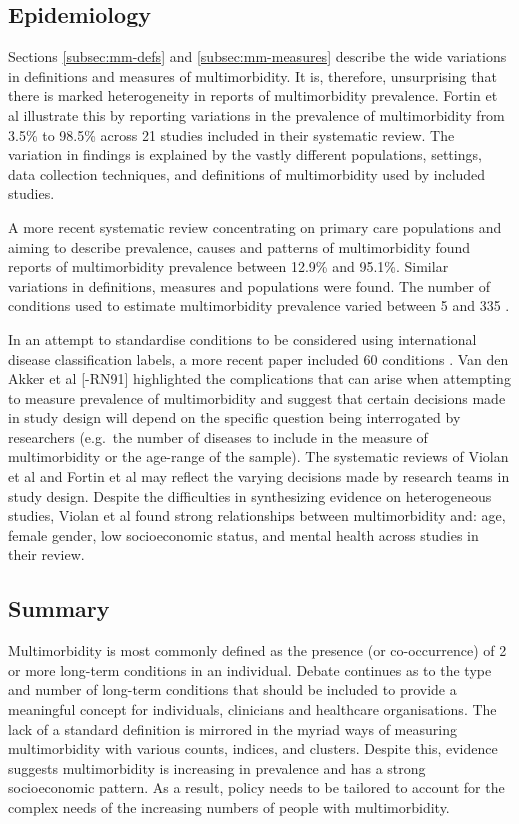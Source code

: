 \documentclass[12pt,]{report}
\begin{document}
\subsection{Epidemiology}\label{subsec:mm-epi}

Sections \ref{subsec:mm-defs} and \ref{subsec:mm-measures} describe the
wide variations in definitions and measures of multimorbidity. It is,
therefore, unsurprising that there is marked heterogeneity in reports of
multimorbidity prevalence. Fortin et al \citeyearpar{RN56} illustrate
this by reporting variations in the prevalence of multimorbidity from
3.5\% to 98.5\% across 21 studies included in their systematic review.
The variation in findings is explained by the vastly different
populations, settings, data collection techniques, and definitions of
multimorbidity used by included studies.

A more recent systematic review concentrating on primary care
populations and aiming to describe prevalence, causes and patterns of
multimorbidity \citep{RN15} found reports of multimorbidity prevalence
between 12.9\% and 95.1\%. Similar variations in definitions, measures
and populations were found. The number of conditions used to estimate
multimorbidity prevalence varied between 5 and 335 \citep{RN15}.

In an attempt to standardise conditions to be considered using
international disease classification labels, a more recent paper
included 60 conditions \citep{RN300}. Van den Akker et al {[}-RN91{]}
highlighted the complications that can arise when attempting to measure
prevalence of multimorbidity and suggest that certain decisions made in
study design will depend on the specific question being interrogated by
researchers (e.g.~the number of diseases to include in the measure of
multimorbidity or the age-range of the sample). The systematic reviews
of Violan et al \citeyearpar{RN15} and Fortin et al \citeyearpar{RN56}
may reflect the varying decisions made by research teams in study
design. Despite the difficulties in synthesizing evidence on
heterogeneous studies, Violan et al \citeyearpar{RN15} found strong
relationships between multimorbidity and: age, female gender, low
socioeconomic status, and mental health across studies in their review.

\subsection{Summary}\label{subsec:mm-summary}

Multimorbidity is most commonly defined as the presence (or
co-occurrence) of 2 or more long-term conditions in an individual.
Debate continues as to the type and number of long-term conditions that
should be included to provide a meaningful concept for individuals,
clinicians and healthcare organisations. The lack of a standard
definition is mirrored in the myriad ways of measuring multimorbidity
with various counts, indices, and clusters. Despite this, evidence
suggests multimorbidity is increasing in prevalence and has a strong
socioeconomic pattern. As a result, policy needs to be tailored to
account for the complex needs of the increasing numbers of people with
multimorbidity.
\end{document}
